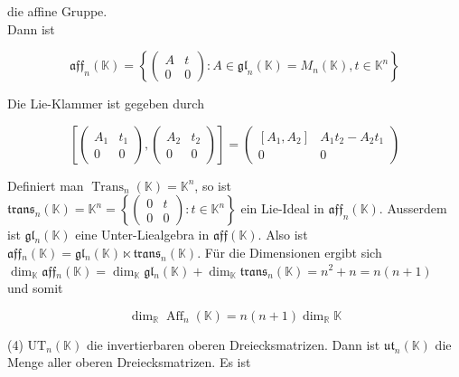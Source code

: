 \documentclass[10pt, letterpaper]{article}
\begin{document}
die affine Gruppe.\\
Dann ist

$$
\mathfrak{a f f}_{n}(\mathbb{K})=\left\{\left(\begin{array}{cc}
A & t \\
0 & 0
\end{array}\right): A \in \mathfrak{g l}_{n}(\mathbb{K})=M_{n}(\mathbb{K}), t \in \mathbb{K}^{n}\right\}
$$

Die Lie-Klammer ist gegeben durch

$$
\left[\left(\begin{array}{cc}
A_{1} & t_{1} \\
0 & 0
\end{array}\right),\left(\begin{array}{cc}
A_{2} & t_{2} \\
0 & 0
\end{array}\right)\right]=\left(\begin{array}{cc}
{\left[A_{1}, A_{2}\right]} & A_{1} t_{2}-A_{2} t_{1} \\
0 & 0
\end{array}\right)
$$

Definiert man $\operatorname{Trans}_{n}(\mathbb{K})=\mathbb{K}^{n}$, so ist $\mathfrak{t r a n s}_{n}(\mathbb{K})=\mathbb{K}^{n}= \left\{\left(\begin{array}{cc}0 & t \\ 0 & 0\end{array}\right): t \in \mathbb{K}^{n}\right\}$ ein Lie-Ideal in $\mathfrak{a f f}_{n}(\mathbb{K})$. Ausserdem ist $\mathfrak{g} \mathfrak{l}_{n}(\mathbb{K})$ eine Unter-Liealgebra in $\mathfrak{a f f}(\mathbb{K})$. Also ist $\mathfrak{a f f}{ }_{n}(\mathbb{K})= \mathfrak{g} \mathfrak{l}_{n}(\mathbb{K}) \ltimes \mathfrak{t r a n s}_{n}(\mathbb{K})$. Für die Dimensionen ergibt sich\\
$\operatorname{dim}_{\mathbb{K}} \mathfrak{a f f}{ }_{n}(\mathbb{K})=\operatorname{dim}_{\mathbb{K}} \mathfrak{g} \mathfrak{l}_{n}(\mathbb{K})+\operatorname{dim}_{\mathbb{K}} \mathfrak{t r a n s}_{n}(\mathbb{K})=n^{2}+n=n(n+1)$\\
und somit

$$
\operatorname{dim}_{\mathbb{R}} \operatorname{Aff}_{n}(\mathbb{K})=n(n+1) \operatorname{dim}_{\mathbb{R}} \mathbb{K}
$$

(4) $\mathrm{UT}_{n}(\mathbb{K})$ die invertierbaren oberen Dreiecksmatrizen. Dann ist $\mathfrak{u t}_{n}(\mathbb{K})$ die Menge aller oberen Dreiecksmatrizen. Es ist
\end{document}
